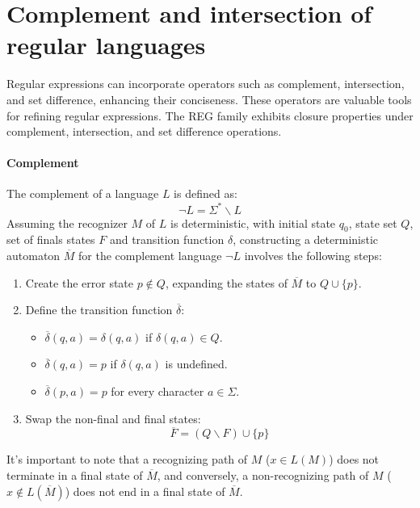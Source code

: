 \section{Complement and intersection of regular languages}

Regular expressions can incorporate operators such as complement, intersection, and set difference, enhancing their conciseness. 
These operators are valuable tools for refining regular expressions. 
The REG family exhibits closure properties under complement, intersection, and set difference operations.

\paragraph*{Complement}
The complement of a language $L$ is defined as: 
\[\lnot L = \Sigma^{*} \backslash L\]
Assuming the recognizer $M$ of $L$ is deterministic, with initial state $q_0$, state set $Q$, set of finals states $F$ and transition function $\delta$, constructing a deterministic automaton $\overline{M}$ for the complement language $\lnot L$ involves the following steps:
\begin{enumerate}
    \item Create the error state $p \notin Q$, expanding the states of $\overline{M}$ to $Q \cup \{ p \}$. 
    \item Define the transition function $\overline{\delta}$: 
        \begin{itemize}
            \item $\overline{\delta}(q,a)=\delta(q,a)$ if $\delta(q,a) \in Q$. 
            \item $\overline{\delta}(q,a)=p$ if $\delta(q,a)$ is undefined. 
            \item $\overline{\delta}(p,a)=p$ for every character $a \in \Sigma$. 
        \end{itemize}
    \item Swap the non-final and final states:
        \[\overline{F}=(Q \backslash F) \cup \{p\}\]
\end{enumerate}
It's important to note that a recognizing path of $M$ ($x \in L(M)$) does not terminate in a final state of $\overline{M}$, and conversely, a non-recognizing path of $M$ ($x \notin L(\overline{M})$) does not end in a final state of $\overline{M}$.
